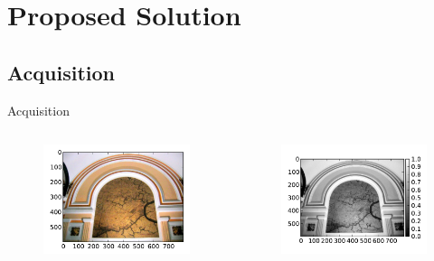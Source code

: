 \documentclass{beamer}
\begin{document}
\section{Proposed Solution}
\subsection{Acquisition}
\begin{frame}{Acquisition}
    \begin{columns}
        \begin{column}{0.5\textwidth}
            \begin{figure}
                \includegraphics[width=\textwidth]{illustrations/input_example_color}
            \end{figure}
        \end{column}
        \begin{column}{0.25\textwidth}
            \begin{figure}
                \includegraphics[width=\textwidth]{illustrations/input_example_luma}

\end{figure}
\end{column}
\end{columns}
\end{frame}
\end{document}
